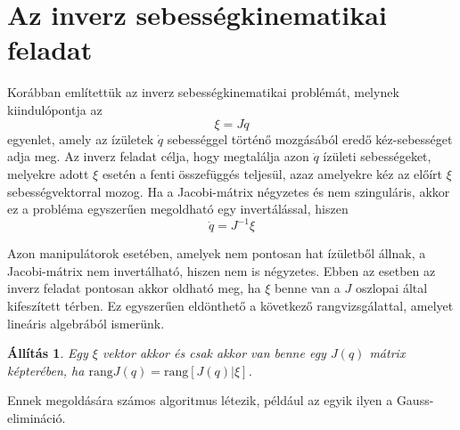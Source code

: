 \documentclass[12pt,a4paper]{report}
\newtheorem{áll}[tét]{Állítás}
\theoremstyle{remark}
\theoremstyle{definition}
\begin{document}
\section{Az inverz sebességkinematikai feladat}
Korábban említettük az inverz sebességkinematikai problémát, melynek kiindulópontja az
\begin{equation}
\xi = J\dot{q}
\end{equation}
egyenlet, amely az ízületek $\dot{q}$ sebességgel történő mozgásából eredő kéz-sebességet adja meg. Az inverz  
feladat célja, hogy megtalálja azon $\dot{q}$ ízületi sebességeket, melyekre adott $\xi$ esetén a fenti összefüggés 
teljesül, azaz amelyekre kéz az előírt $\xi$ sebességvektorral mozog. Ha a Jacobi-mátrix négyzetes és nem 
szinguláris, akkor ez a probléma egyszerűen megoldható egy invertálással, hiszen
\begin{equation}
\dot{q} = J^{-1}\xi
\end{equation}

Azon manipulátorok esetében, amelyek nem pontosan hat ízületből állnak, a Jacobi-mátrix nem invertálható, hiszen nem 
is négyzetes. Ebben az esetben az inverz feladat pontosan akkor oldható meg, ha $\xi$ benne van a $J$ oszlopai által 
kifeszített térben. Ez egyszerűen eldönthető a következő rangvizsgálattal, amelyet lineáris algebrából ismerünk. 
\begin{áll}
Egy $\xi$ vektor akkor és csak akkor van benne egy $J(q)$ mátrix képterében, ha 
$\mathrm{rang}J(q) = \mathrm{rang}[J(q) | \xi]$.
\end{áll}
Ennek megoldására számos algoritmus létezik, például az egyik ilyen a Gauss-elimináció. 
\end{document}

